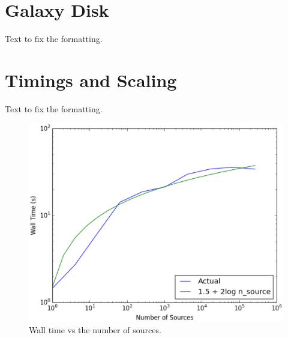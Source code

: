 \section{Galaxy Disk}
\label{sec:galaxydisk}

Text to fix the formatting.

\section{Timings and Scaling}
\label{sec:timing}

Text to fix the formatting.

\begin{figure}
\includegraphics[width=\textwidth]{graphics/Timings.eps}
\caption[Wall time vs the number of sources.]{Wall time vs the number of sources.}
\label{fig:scaling}
\end{figure}

